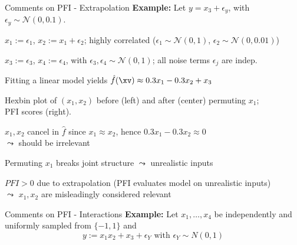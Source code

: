 \documentclass[10pt,compress,t,notes=noshow, xcolor=table]{beamer}
\begin{document}
\begin{framev}[align=top]{Comments on PFI - Extrapolation}
\textbf{Example:} Let $y = x_3 + \epsilon_y$, with $\epsilon_y \sim \mathcal{N}(0, 0.1)$.
\begin{itemizeS}
\item $x_1 := \epsilon_1$, $x_2 := x_1 + \epsilon_2$; highly correlated ($\epsilon_1 \sim \mathcal{N}(0,1)$, $\epsilon_2 \sim \mathcal{N}(0, 0.01)$)
\item $x_3 := \epsilon_3$, $x_4 := \epsilon_4$, with $\epsilon_3, \epsilon_4 \sim \mathcal{N}(0,1)$; all noise terms $\epsilon_j$ are indep.
\item Fitting a linear model yields $\hat{f}(\xv) \approx 0.3 x_1 - 0.3 x_2 + x_3$
\end{itemizeS}
\pause
{\centering
{}
\par}
Hexbin plot of $(x_1, x_2)$ before (left) and after (center) permuting $x_1$;
\\PFI scores (right).
\pause
\begin{itemizeS}
\item[$\Rightarrow$] $x_1, x_2$ cancel in $\hat{f}$ since $x_1 \approx x_2$, hence $0.3 x_1 - 0.3 x_2 \approx 0$ \\$\leadsto$ should be irrelevant
\item[$\Rightarrow$] Permuting $x_1$ breaks joint structure $\leadsto$ unrealistic inputs
\item[$\Rightarrow$] $PFI > 0$ due to extrapolation (PFI evaluates model on unrealistic inputs)\\ $\leadsto$ $x_1, x_2$ are misleadingly considered relevant
\end{itemizeS}
\end{framev}


\begin{framev}[align=top]{Comments on PFI - Interactions}
\textbf{Example:} Let $x_1, \dots, x_4$ be independently and uniformly sampled from $\{-1, 1\}$ and
$$y:= x_1 x_2 + x_3 + \epsilon_Y \text{ with } \epsilon_Y \sim N(0, 1)$$
\end{framev}
\end{document}
